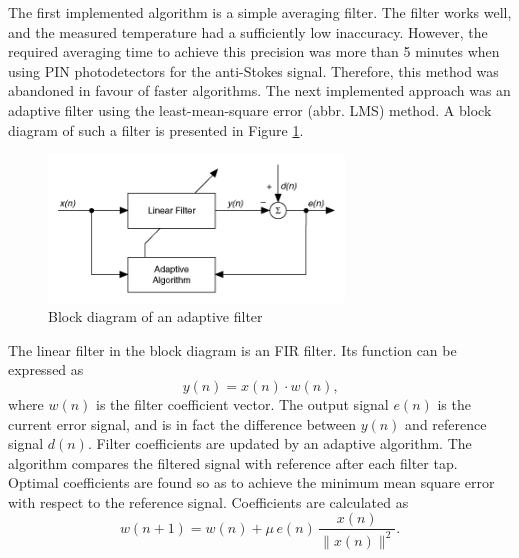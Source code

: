 \documentclass{standalone}
\begin{document}
The first implemented algorithm is a simple averaging filter. The filter works well, and the measured temperature had a sufficiently low inaccuracy. However, the required averaging time to achieve this precision was more than 5 minutes when using PIN photodetectors for the anti-Stokes signal. Therefore, this method was abandoned in favour of faster algorithms. The next implemented approach was an adaptive filter using the least-mean-square error (abbr. LMS) method. A block diagram of such a filter is presented in Figure \ref{fig:lms_block}.
\begin{figure}[h]
	\centering
	\includegraphics[width=0.7\textwidth]{lms_block.png}
	\caption{Block diagram of an adaptive filter \cite{labview:filter}}
	\label{fig:lms_block}
\end{figure}
The linear filter in the block diagram is an FIR filter. Its function can be expressed as \cite{anc}\cite{mitlecture25}
\begin{equation}
y(n) = x(n) \cdot w(n) \textrm{,}
\end{equation}
where $w(n)$ is the filter coefficient vector. The output signal $e(n)$ is the current error signal, and is in fact the difference between $y(n)$ and reference signal $d(n)$. Filter coefficients are updated by an adaptive algorithm. The algorithm compares the filtered signal with reference after each filter tap. Optimal coefficients are found so as to achieve the minimum mean square error with respect to the reference signal. Coefficients are calculated as
\begin{equation} \label{eq:normalizedlms}
w(n+1) = w(n) + \mu \, e(n) \, \frac{x(n)}{\| x(n) \| ^2} \textrm{.}
\end{equation}
\end{document}
